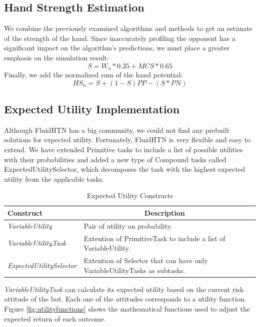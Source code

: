 \subsection{Hand Strength Estimation}

We combine the previously examined algorithms and methods to get an estimate of the strength of the hand. Since inaccurately profiling the opponent has a significant impact on the algorithm's predictions, we must place a greater emphasis on the simulation result:
$$S = W_n * 0.35 + MCS * 0.65$$
Finally, we add the normalized sum of the hand potential:
$$HS_n = S + (1-S) PP - (S * PN)$$

\subsection{Expected Utility Implementation}
Although FluidHTN has a big community, we could not find any prebuilt solutions for expected utility. Fortunately, FluidHTN is very flexible and easy to extend. We have extended Primitive tasks to include a list of possible utilities with their probabilities and added a new type of Compound tasks called ExpectedUtilitySelector, which decomposes the task with the highest expected utility from the applicable tasks.

\begin{table}[h]
    \centering
    \begin{tabular}{|l|l|l|}
        \hline
        \textbf{Construct}               & \multicolumn{1}{c|}{\textbf{Description}}                                                       \\ \hline
        \textit{VariableUtility}         & Pair of utility an probability.                                                                \\ \hline
        \textit{VariableUtilityTask}     & Extention of PrimitiveTask to include a list of VariableUtility.                                \\ \hline
        \textit{ExpectedUtilitySelector} & Extention of Selector that can have only VariableUtilityTasks as subtasks. \\ \hline
    \end{tabular}
    \caption{Expected Utility Constructs}
\end{table}

\textit{VariableUtilityTask} can calculate its expected utility based on the current risk attitude of the bot. Each one of the attitudes corresponds to a utility function. Figure \ref{fig:utilityfunctions} shows the mathematical functions used to adjust the expected return of each outcome.

